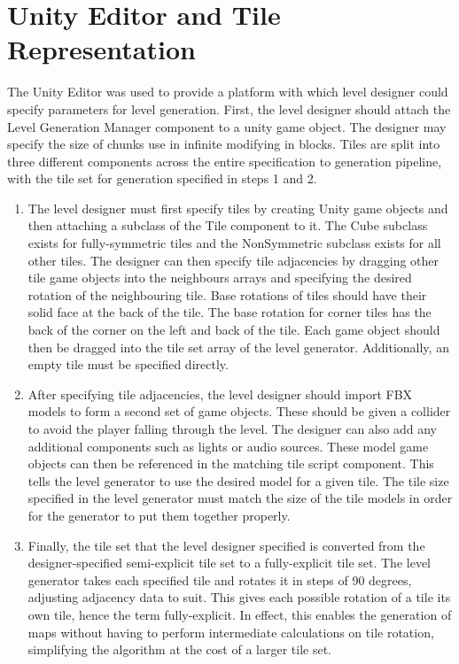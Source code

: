 \section{Unity Editor and Tile Representation}
The Unity Editor was used to provide a platform with which level designer could specify parameters for level generation. First, the level designer should attach the Level Generation Manager component to a unity game object. The designer may specify the size of chunks use in infinite modifying in blocks. Tiles are split into three different components across the entire specification to generation pipeline, with the tile set for generation specified in steps 1 and 2.
\begin{enumerate}
    \item The level designer must first specify tiles by creating Unity game objects and then attaching a subclass of the Tile component to it. The Cube subclass exists for fully-symmetric tiles and the NonSymmetric subclass exists for all other tiles. The designer can then specify tile adjacencies by dragging other tile game objects into the neighbours arrays and specifying the desired rotation of the neighbouring tile. Base rotations of tiles should have their solid face at the back of the tile. The base rotation for corner tiles has the back of the corner on the left and back of the tile. Each game object should then be dragged into the tile set array of the level generator. Additionally, an empty tile must be specified directly.
    \item After specifying tile adjacencies, the level designer should import FBX models to form a second set of game objects. These should be given a collider to avoid the player falling through the level. The designer can also add any additional components such as lights or audio sources. These model game objects can then be referenced in the matching tile script component. This tells the level generator to use the desired model for a given tile. The tile size specified in the level generator must match the size of the tile models in order for the generator to put them together properly.
    \item Finally, the tile set that the level designer specified is converted from the designer-specified semi-explicit tile set to a fully-explicit tile set. The level generator takes each specified tile and rotates it in steps of 90 degrees, adjusting adjacency data to suit. This gives each possible rotation of a tile its own tile, hence the term fully-explicit. In effect, this enables the generation of maps without having to perform intermediate calculations on tile rotation, simplifying the algorithm at the cost of a larger tile set.
\end{enumerate}

